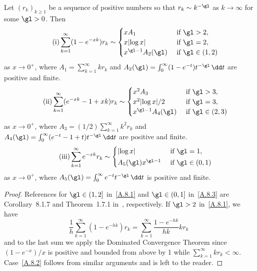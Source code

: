 \pagebreak
\begin{lemm}\label{seriesAsymptotics}
Let $(r_k)_{k\ge1}$ be a sequence of positive numbers so that $r_k\sim k^{-\gl}$ as $k\to\infty$ for some $\gl>0$. Then
\begin{equation} \tag{i} \label{A.8.1}
\sum_{k=1}^\infty (1-e^{-xk})r _k\sim
\begin{cases} x A_1& \text{ if } \gl>2, \\
x |{\log x}| & \text{ if } \gl=2, \\
x^{\gl-1}A_2(\gl) & \text{ if } \gl\in(1, 2) \\
\end{cases}
\end{equation}
as $x\to 0^+$, where $A_1=\sum_{k=1}^\infty k r_k$ and $A_2(\gl)=\int_0^\infty (1-e^{-t}) t^{-\gl}\, \dd t$ are positive and finite.
\begin{equation} \tag{ii} \label{A.8.2}
\sum_{k=1}^\infty (e^{-xk}-1+xk) r_k\sim
\begin{cases} x^2 A_3& \text{ if } \gl>3, \\
x^2|{\log x}|/2 & \text{ if } \gl=3, \\
x^{\gl-1}A_4(\gl) & \text{ if } \gl\in(2, 3) \\
\end{cases}
\end{equation}
as $x\to 0^+$, where $A_3=(1/2)\sum_{k=1}^\infty k^2 r_k$ and $A_4(\gl)=\int_0^\infty (e^{-t}-1+t) t^{-\gl}\, \dd t$ are positive and finite.
\begin{equation} \tag{iii} \label{A.8.3}
\sum_{k=1}^\infty e^{-xk} r_k \sim
\begin{cases}
|{\log x}| & \text{ if } \gl = 1,\\[2pt] A_5(\gl) x^{\gl-1}& \text{ if } \gl \in (0,1)
\end{cases}
\end{equation}
as $x\to 0^+$, where $A_5(\gl)=\int_0^\infty e^{-t}t^{-\gl}\, \dd t$ is positive and finite.
\end{lemm}

\begin{proof}
References for $\gl\in (1,2]$ in~\eqref{A.8.1} and $\gl\in(0,1]$ in~\eqref{A.8.3} are Corollary~8.1.7 and Theorem~1.7.1 in~\cite{BGT89}, respectively. If $\gl>2$ in~\eqref{A.8.1}, we have
\[
\frac{1}{h}\sum_{k=1}^\infty (1-e^{-hk}) r_k=\sum_{k=1}^\infty \frac{1-e^{-hk}}{hk} k r_k
\]
and to the last sum we apply the Dominated Convergence Theorem since $(1-e^{-x})/x$ is positive and bounded from above by 1 while $\sum_{k=1}^\infty k r_k<\infty$. Case~\eqref{A.8.2} follows from similar arguments and is left to the reader.
\end{proof}


